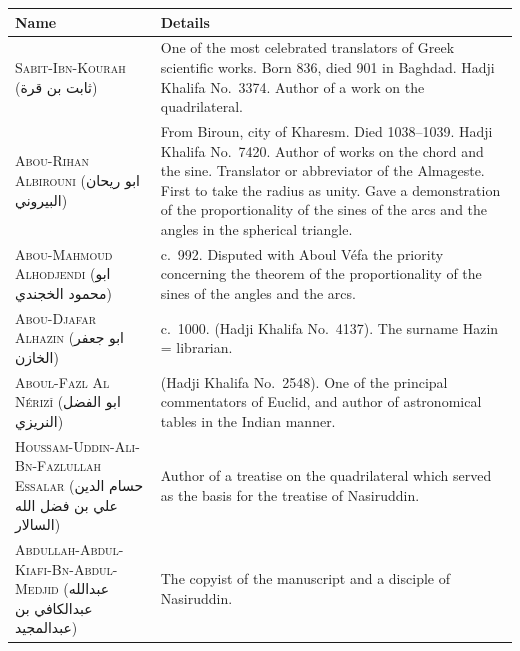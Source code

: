 \documentclass[11pt,a4paper]{article}
\theoremstyle{plain}
\theoremstyle{definition}
\theoremstyle{remark}
\newcommand{\ar}[1]{{\arabicfont\beginR #1\endR}}
\begin{document}
\begin{center}
\begin{longtable}{p{}p{}}
\toprule
\textbf{Name} & \textbf{Details} \\
\midrule
\endhead

\textsc{Sabit-Ibn-Kourah} (\ar{ثابت بن قرة}) & One of the most celebrated translators of Greek scientific works. Born 836, died 901 in Baghdad. Hadji Khalifa No.~3374. Author of a work on the quadrilateral. \\
\addlinespace[0.2cm]

\textsc{Abou-Rihan Albirouni} (\ar{ابو ريحان البيروني}) & From Biroun, city of Kharesm. Died 1038--1039. Hadji Khalifa No.~7420. Author of works on the chord and the sine. Translator or abbreviator of the Almageste. First to take the radius as unity. Gave a demonstration of the proportionality of the sines of the arcs and the angles in the spherical triangle. \\
\addlinespace[0.2cm]

\textsc{Abou-Mahmoud Alhodjendi} (\ar{ابو محمود الخجندي}) & c.~992. Disputed with Aboul Véfa the priority concerning the theorem of the proportionality of the sines of the angles and the arcs. \\
\addlinespace[0.2cm]

\textsc{Abou-Djafar Alhazin} (\ar{ابو جعفر الخازن}) & c.~1000. (Hadji Khalifa No.~4137). The surname Hazin = librarian. \\
\addlinespace[0.2cm]

\textsc{Aboul-Fazl Al Nérizî} (\ar{ابو الفضل النريزي}) & (Hadji Khalifa No.~2548). One of the principal commentators of Euclid, and author of astronomical tables in the Indian manner. \\
\addlinespace[0.2cm]

\textsc{Houssam-Uddin-Ali-Bn-Fazlullah Essalar} (\ar{حسام الدين علي بن فضل الله السالار}) & Author of a treatise on the quadrilateral which served as the basis for the treatise of Nasiruddin. \\
\addlinespace[0.2cm]

\textsc{Abdullah-Abdul-Kiafi-Bn-Abdul-Medjid} (\ar{عبدالله عبدالكافي بن عبدالمجيد}) & The copyist of the manuscript and a disciple of Nasiruddin. \\

\bottomrule
\end{longtable}
\end{center}

\clearpage
\end{document}
